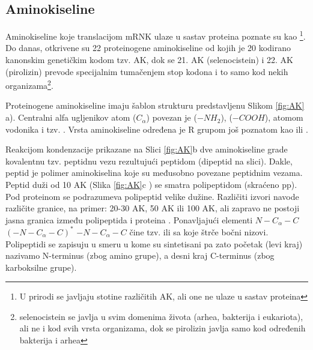 \subsection{Aminokiseline}
Aminokiseline koje translacijom mRNK ulaze u sastav proteina poznate su kao
\footnote{U prirodi se javljaju stotine različitih AK, ali
one ne ulaze u sastav proteina}.  Do danas, otkrivene su 22 proteinogene
aminokiseline od kojih je 20 kodirano kanonskim genetičkim kodom tzv.
 AK, dok se 21. AK (selenocistein) i 22. AK (pirolizin)
prevode specijalnim tumačenjem stop kodona i to samo kod nekih organizama\footnote{
  selenocistein se javlja u svim domenima života (arhea, bakterija i
  eukariota), ali ne i kod svih vrsta organizama, dok se pirolizin javlja samo
kod određenih bakterija i arhea}. 

Proteinogene aminokiseline imaju šablon strukturu predstavljenu Slikom \ref{fig:AK} a).
Centralni alfa ugljenikov atom ($C_{\alpha}$) povezan je  ($-NH_2$), 
 ($-COOH$), atomom vodonika i tzv. .
Vrsta aminokiseline određena je R grupom još poznatom kao  ili  .

Reakcijom kondenzacije prikazane na Slici \ref{fig:AK}b dve aminokiseline grade
kovalentnu tzv. peptidnu vezu rezultujući peptidom (dipeptid na slici).  Dakle,
peptid je polimer aminokiselina koje su međusobno povezane peptidnim vezama.
Peptid duži od 10 AK (Slika \ref{fig:AK}c ) se smatra polipeptidom (skraćeno
pp). Pod proteinom se podrazumeva polipeptid velike dužine. Različiti izvori
navode različite granice, na primer: 20-30 AK, 50 AK ili 100 AK, ali zapravo ne
postoji jasna granica između polipeptida i proteina
\parencite{protein_slajdovi}. Ponavljajući elementi $N-C_\alpha-C$
$(-N-C_\alpha-C)^*$ $-N-C_\alpha-C$ čine tzv.   ili
 sa koje štrče bočni nizovi.  Polipeptidi se zapisuju u
smeru u kome su sintetisani pa zato  početak (levi kraj) nazivamo N-terminus
(zbog amino grupe), a desni kraj C-terminus (zbog
karboksilne grupe).


